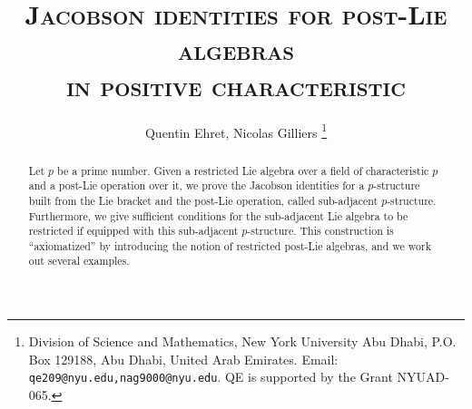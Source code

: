 \documentclass[12pt]{article}
\date{}
\newcommand{\red}{\color{red}}
\newcommand{\black}{\color{black}}
\begin{document}
\title{\Large \textsc{Jacobson identities for post-Lie algebras \\ in positive characteristic}}




\author{\normalsize Quentin Ehret, Nicolas Gilliers {}\footnote{Division of Science and Mathematics, New York University Abu Dhabi, P.O. Box 129188, Abu Dhabi, United Arab Emirates. Email: \texttt{qe209@nyu.edu,nag9000@nyu.edu}. QE is supported by the Grant NYUAD-065.}}








\maketitle

\begin{abstract}
Let $p$ be a prime number. Given a restricted Lie algebra over a field of characteristic $p$ and a post-Lie operation over it, we prove the Jacobson identities for a $p$-structure built from the Lie bracket and the post-Lie operation, called sub-adjacent $p$-structure. Furthermore, we give sufficient conditions for the sub-adjacent Lie algebra to be restricted if equipped with this sub-adjacent $p$-structure. This construction is ``axiomatized'' by introducing the notion of restricted post-Lie algebras, and we work out several examples. 
\end{abstract}
\thispagestyle{empty}
\setcounter{tocdepth}{2}
\tableofcontents




\end{document}
